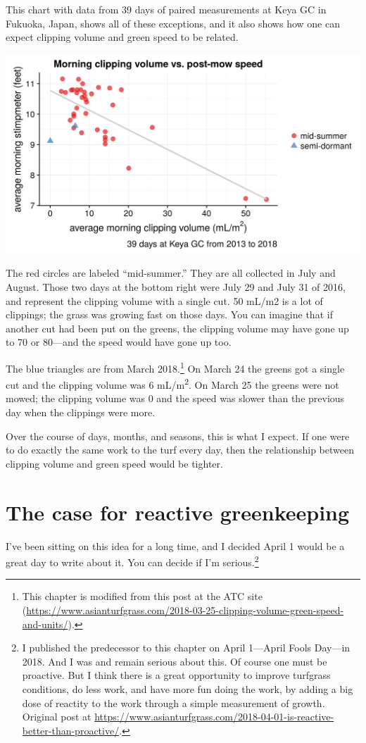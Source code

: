 \documentclass[12pt,b5,]{tufte-book}
\begin{document}
This chart with data from 39 days of paired measurements at Keya GC in Fukuoka, Japan, shows all of these exceptions, and it also shows how one can expect clipping volume and green speed to be related.

\includegraphics{img/clip_vs_speed.png}

The red circles are labeled ``mid-summer.'' They are all collected in July and August. Those two days at the bottom right were July 29 and July 31 of 2016, and represent the clipping volume with a single cut. 50 mL/m2 is a lot of clippings; the grass was growing fast on those days. You can imagine that if another cut had been put on the greens, the clipping volume may have gone up to 70 or 80---and the speed would have gone up too.

The blue triangles are from March 2018.\footnote{This chapter is modified from this post at the ATC site (\url{https://www.asianturfgrass.com/2018-03-25-clipping-volume-green-speed-and-units/}).} On March 24 the greens got a single cut and the clipping volume was 6 mL/m\textsuperscript{2}. On March 25 the greens were not mowed; the clipping volume was 0 and the speed was slower than the previous day when the clippings were more.

Over the course of days, months, and seasons, this is what I expect. If one were to do exactly the same work to the turf every day, then the relationship between clipping volume and green speed would be tighter.

\hypertarget{the-case-for-reactive-greenkeeping}{%
\chapter{The case for reactive greenkeeping}\label{the-case-for-reactive-greenkeeping}}

I've been sitting on this idea for a long time, and I decided April 1 would be a great day to write about it. You can decide if I'm serious.\footnote{I published the predecessor to this chapter on April 1---April Fools Day---in 2018. And I was and remain serious about this. Of course one must be proactive. But I think there is a great opportunity to improve turfgrass conditions, do less work, and have more fun doing the work, by adding a big dose of reactity to the work through a simple measurement of growth. Original post at \url{https://www.asianturfgrass.com/2018-04-01-is-reactive-better-than-proactive/}.}
\end{document}
